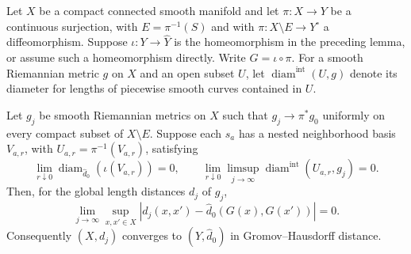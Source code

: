 Let $X$ be a compact connected smooth manifold and let $\pi:X\to Y$ be a continuous surjection, with $E=\pi^{-1}(S)$ and with $\pi:X\setminus E\to Y^\circ$ a diffeomorphism. Suppose $\iota:Y\to\widehat Y$ is the homeomorphism in the preceding lemma, or assume such a homeomorphism directly. Write $G=\iota\circ\pi$. For a smooth Riemannian metric $g$ on $X$ and an open subset $U$, let $\operatorname{diam}^{\mathrm{int}}(U,g)$ denote its diameter for lengths of piecewise smooth curves contained in $U$.

\begin{proposition}\label{prop:finite-collapse-distance}
Let $g_j$ be smooth Riemannian metrics on $X$ such that $g_j\to\pi^*g_0$ uniformly on every compact subset of $X\setminus E$. Suppose each $s_a$ has a nested neighborhood basis $V_{a,r}$, with $U_{a,r}=\pi^{-1}(V_{a,r})$, satisfying
\[
 \lim_{r\downarrow0}\operatorname{diam}_{\widehat d_0}(\iota(V_{a,r}))=0,
 \qquad
 \lim_{r\downarrow0}\limsup_{j\to\infty}
       \operatorname{diam}^{\mathrm{int}}(U_{a,r},g_j)=0.
\]
Then, for the global length distances $d_j$ of $g_j$,
\[
 \lim_{j\to\infty}\sup_{x,x'\in X}
    |d_j(x,x')-\widehat d_0(G(x),G(x'))|=0.
\]
Consequently $(X,d_j)$ converges to $(\widehat Y,\widehat d_0)$ in Gromov--Hausdorff distance.
\end{proposition}
